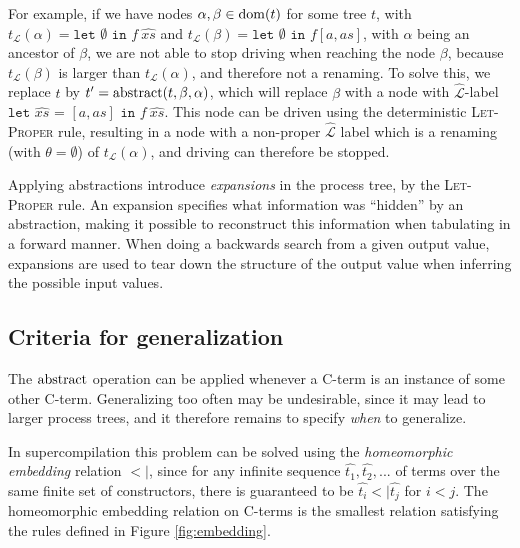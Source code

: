 \documentclass[10pt]{../sigplanconf}
\newcommand{\dom}{\ensuremath{{\rm dom}}}
\begin{document}
For example, if we have nodes $\alpha,\beta \in \dom(t)$ for some tree
$t$, with $t_\mathcal{L}(\alpha) = \texttt{let $\emptyset$ in $f
  ~\widehat{xs}$}$ and $t_\mathcal{L}(\beta) = \texttt{let $\emptyset$ in $f [a, as]$}$, with $\alpha$ being an ancestor of $\beta$, we are
not able to stop driving when reaching the node $\beta$, because
$t_\mathcal{L}(\beta)$ is larger than $t_\mathcal{L}(\alpha)$, and
therefore not a renaming. To solve this, we replace $t$ by $t' = {\rm
  abstract}(t, \beta, \alpha)$, which will replace $\beta$ with a node
with $\widehat{\mathcal{L}}$-label $\texttt{let $\widehat{xs}$ = $[a,
  as]$ in $f~\widehat{xs}$}$. This node can be driven using the
deterministic \textsc{Let-Proper} rule, resulting in a node with a
non-proper $\widehat{\mathcal{L}}$ label which is a renaming (with
$\theta = \emptyset$) of $t_\mathcal{L}(\alpha)$, and driving can
therefore be stopped.

Applying abstractions introduce \emph{expansions} in the process tree,
by the \textsc{Let-Proper} rule. An expansion specifies what
information was ``hidden'' by an abstraction, making it possible to
reconstruct this information when tabulating in a forward manner. When
doing a backwards search from a given output value, expansions are
used to tear down the structure of the output value when inferring the
possible input values.

\subsection{Criteria for generalization}
The ${\rm abstract}$ operation can be applied whenever a C-term is an
instance of some other C-term. Generalizing too often may be
undesirable, since it may lead to larger process trees, and it
therefore remains to specify \emph{when} to generalize.

In supercompilation\cite{sorensen1998introduction} this problem can be
solved using the \emph{homeomorphic embedding} relation $<|$, since
for any infinite sequence $\widehat{t_1}, \widehat{t_2}, ...$ of terms
over the same finite set of constructors, there is guaranteed to be
$\widehat{t_i} <| \widehat{t_j}$ for $i < j$. The homeomorphic embedding relation on C-terms is the
smallest relation satisfying the rules defined in Figure
\ref{fig:embedding}.
\end{document}
